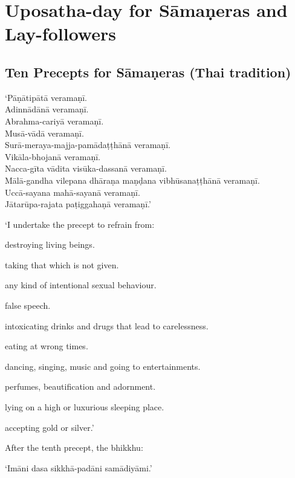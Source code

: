 \section{Uposatha-day for Sāmaṇeras and Lay-followers}

\subsection{Ten Precepts for Sāmaṇeras (Thai tradition)}

‘Pāṇātipātā veramaṇī.\\
Adinnādānā veramaṇī.\\
Abrahma-cariyā veramaṇī.\\
Musā-vādā veramaṇī.\\
Surā-meraya-majja-pamādaṭṭhānā veramaṇī.\\
Vikāla-bhojanā veramaṇī.\\
Nacca-gīta vādita visūka-dassanā veramaṇī.\\
Mālā-gandha vilepana dhāraṇa maṇḍana vibhūsanaṭṭhānā veramaṇī.\\
Uccā-sayana mahā-sayanā veramaṇī.\\
Jātarūpa-rajata paṭiggahaṇā veramaṇī.’

{\itshape

‘I undertake the precept to refrain from:

\begin{packeditemize}

\item destroying living beings.
\item taking that which is not given.
\item any kind of intentional sexual behaviour.
\item false speech.
\item intoxicating drinks and drugs that lead to carelessness.
\item eating at wrong times.
\item dancing, singing, music and going to entertainments.
\item perfumes, beautification and adornment.
\item lying on a high or luxurious sleeping place.
\item accepting gold or silver.’

\end{packeditemize}

}

After the tenth precept, the bhikkhu:

‘Imāni dasa sikkhā-padāni samādiyāmi.’

